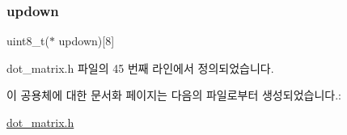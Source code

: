 \subsubsection{\texorpdfstring{updown}{updown}}
{\footnotesize\ttfamily uint8\+\_\+t($\ast$ updown)\mbox{[}8\mbox{]}}



dot\+\_\+matrix.\+h 파일의 45 번째 라인에서 정의되었습니다.



이 공용체에 대한 문서화 페이지는 다음의 파일로부터 생성되었습니다.\+:\begin{DoxyCompactItemize}
\item 
\hyperlink{dot__matrix_8h}{dot\+\_\+matrix.\+h}\end{DoxyCompactItemize}
